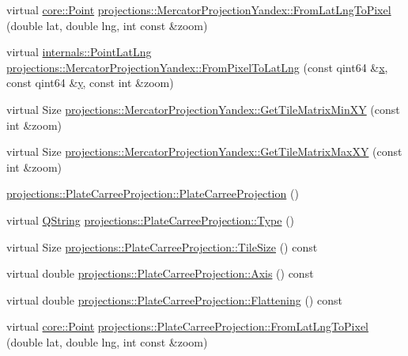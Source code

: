 \begin{DoxyCompactItemize}
\item 
virtual \hyperlink{structcore_1_1_point}{core\-::\-Point} \hyperlink{group___o_p_map_widget_ga165e0f0502d73b38e1712e95eeaffb10}{projections\-::\-Mercator\-Projection\-Yandex\-::\-From\-Lat\-Lng\-To\-Pixel} (double lat, double lng, int const \&zoom)
\item 
virtual \hyperlink{structinternals_1_1_point_lat_lng}{internals\-::\-Point\-Lat\-Lng} \hyperlink{group___o_p_map_widget_ga05a8dfb0d9ffc159da5776934f61d6ee}{projections\-::\-Mercator\-Projection\-Yandex\-::\-From\-Pixel\-To\-Lat\-Lng} (const qint64 \&\hyperlink{_o_p_plots_8m_a9336ebf25087d91c818ee6e9ec29f8c1}{x}, const qint64 \&\hyperlink{_o_p_plots_8m_a2fb1c5cf58867b5bbc9a1b145a86f3a0}{y}, const int \&zoom)
\item 
virtual \-Size \hyperlink{group___o_p_map_widget_gae31d23a05a2c6771d8a5c2557d51f2dc}{projections\-::\-Mercator\-Projection\-Yandex\-::\-Get\-Tile\-Matrix\-Min\-X\-Y} (const int \&zoom)
\item 
virtual \-Size \hyperlink{group___o_p_map_widget_ga7ecba9178be61022f6e533b06422a17e}{projections\-::\-Mercator\-Projection\-Yandex\-::\-Get\-Tile\-Matrix\-Max\-X\-Y} (const int \&zoom)
\item 
\hyperlink{group___o_p_map_widget_ga931c372d511eb5f902be68e721dea1a1}{projections\-::\-Plate\-Carree\-Projection\-::\-Plate\-Carree\-Projection} ()
\item 
virtual \hyperlink{group___u_a_v_objects_plugin_gab9d252f49c333c94a72f97ce3105a32d}{\-Q\-String} \hyperlink{group___o_p_map_widget_ga71ab3c89676e92a088c8ac2ce4058142}{projections\-::\-Plate\-Carree\-Projection\-::\-Type} ()
\item 
virtual \-Size \hyperlink{group___o_p_map_widget_gacf9afa88981c6504040c08c19731ea98}{projections\-::\-Plate\-Carree\-Projection\-::\-Tile\-Size} () const 
\item 
virtual double \hyperlink{group___o_p_map_widget_ga0917ee78fdc28e179792601c612072e9}{projections\-::\-Plate\-Carree\-Projection\-::\-Axis} () const 
\item 
virtual double \hyperlink{group___o_p_map_widget_ga9826466bb3f7ed3e3bd1f3a5b8a538d5}{projections\-::\-Plate\-Carree\-Projection\-::\-Flattening} () const 
\item 
virtual \hyperlink{structcore_1_1_point}{core\-::\-Point} \hyperlink{group___o_p_map_widget_ga36e2342a818ea95326dc2100e9f39460}{projections\-::\-Plate\-Carree\-Projection\-::\-From\-Lat\-Lng\-To\-Pixel} (double lat, double lng, int const \&zoom)
\item 

\end{DoxyCompactItemize}
